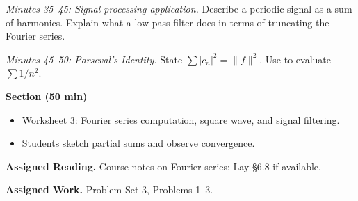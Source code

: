 \documentclass{amsart}
\begin{document}
\textit{Minutes 35--45: Signal processing application.} Describe a periodic signal as a sum of harmonics. Explain what a low-pass filter does in terms of truncating the Fourier series.

\textit{Minutes 45--50: Parseval's Identity.} State $\sum |c_n|^2 = \|f\|^2$. Use to evaluate $\sum 1/n^2$.

\bigskip

\textbf{Section (50 min)}
\begin{itemize}
    \item Worksheet 3: Fourier series computation, square wave, and signal filtering.
    \item Students sketch partial sums and observe convergence.
\end{itemize}

\bigskip

\textbf{Assigned Reading.} Course notes on Fourier series; Lay \S6.8 if available.

\textbf{Assigned Work.} Problem Set 3, Problems 1--3.
\end{document}
